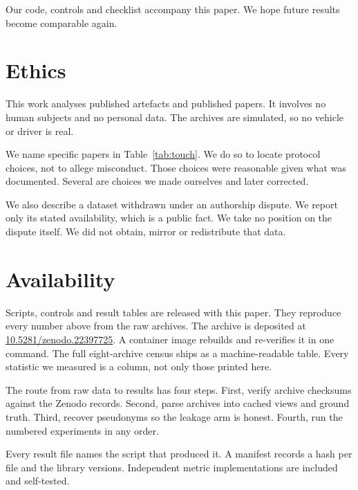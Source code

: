 \documentclass[conference]{IEEEtran}
\begin{document}
Our code, controls and checklist accompany this paper.
We hope future results become comparable again.

\section*{Ethics}

This work analyses published artefacts and published papers.
It involves no human subjects and no personal data.
The archives are simulated, so no vehicle or driver is real.

We name specific papers in Table~\ref{tab:touch}.
We do so to locate protocol choices, not to allege misconduct.
Those choices were reasonable given what was documented.
Several are choices we made ourselves and later corrected.

We also describe a dataset withdrawn under an authorship dispute.
We report only its stated availability, which is a public fact.
We take no position on the dispute itself.
We did not obtain, mirror or redistribute that data.

\section*{Availability}

Scripts, controls and result tables are released with this paper.
They reproduce every number above from the raw archives.
The archive is deposited at \url{10.5281/zenodo.22397725}.
A container image rebuilds and re-verifies it in one command.
The full eight-archive census ships as a machine-readable table.
Every statistic we measured is a column, not only those printed here.

The route from raw data to results has four steps.
First, verify archive checksums against the Zenodo records.
Second, parse archives into cached views and ground truth.
Third, recover pseudonyms so the leakage arm is honest.
Fourth, run the numbered experiments in any order.

Every result file names the script that produced it.
A manifest records a hash per file and the library versions.
Independent metric implementations are included and self-tested.
\end{document}
